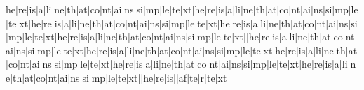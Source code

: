 he|re|is|a|li|ne|th|at|co|nt|ai|ns|si|mp|le|te|xt|he|re|is|a|li|ne|th|at|co|nt|ai|ns|si|mp|le|te|xt|he|re|is|a|li|ne|th|at|co|nt|ai|ns|si|mp|le|te|xt|he|re|is|a|li|ne|th|at|co|nt|ai|ns|si|mp|le|te|xt|he|re|is|a|li|ne|th|at|co|nt|ai|ns|si|mp|le|te|xt||he|re|is|a|li|ne|th|at|co|nt|ai|ns|si|mp|le|te|xt|he|re|is|a|li|ne|th|at|co|nt|ai|ns|si|mp|le|te|xt|he|re|is|a|li|ne|th|at|co|nt|ai|ns|si|mp|le|te|xt|he|re|is|a|li|ne|th|at|co|nt|ai|ns|si|mp|le|te|xt|he|re|is|a|li|ne|th|at|co|nt|ai|ns|si|mp|le|te|xt||he|re|is||af|te|r|te|xt%
